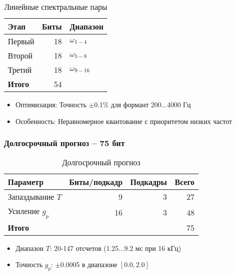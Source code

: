\documentclass{report}
\begin{document}
	\begin{table}[H]
		\centering
		\caption{Линейные спектральные пары}
		\begin{tabular}{lrl}
			\toprule
				Этап & Биты & Диапазон \\
			\midrule
				Первый & 18 & $\omega_{1-4}$ \\
				Второй & 18 & $\omega_{5-8}$ \\ 
				Третий & 18 & $\omega_{9-16}$ \\
			\bottomrule
				\textbf{Итого} & 54 & \\
			\bottomrule
		\end{tabular}
	\end{table}
	
	\begin{itemize}
		\item Оптимизация: Точность $\pm$0.1\% для формант 200$\ldots$4000 Гц
		\item Особенность: Неравномерное квантование с приоритетом низких частот
	\end{itemize}

	\subsubsection{Долгосрочный прогноз -- 75 бит}
	\begin{table}[H]
		\centering
		\caption{Долгосрочный прогноз}
		\begin{tabular}{lrrr}
			\toprule
				\textbf{Параметр} & \textbf{Биты/подкадр} & \textbf{Подкадры} & \textbf{Всего} \\
			\midrule
				Запаздывание $T$ & 9 & 3 & 27 \\
				Усиление $g_p$ & 16 & 3 & 48 \\
			\bottomrule
				\textbf{Итого} & & & 75 \\
			\bottomrule
		\end{tabular}
	\end{table}
	
	\begin{itemize}
		\item Диапазон $T$: 20-147 отсчетов (1.25$\ldots$9.2 мс при 16 кГц)
		\item Точность $g_p$: $\pm$0.0005 в диапазоне $[0.0, 2.0]$
	\end{itemize}
\end{document}

